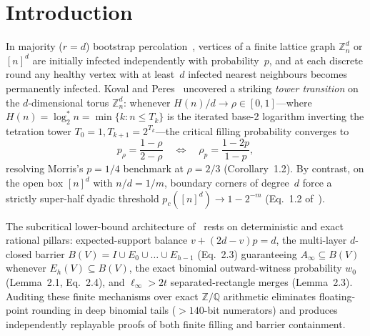 \documentclass[11pt,twocolumn]{article}
\newcommand{\ZZ}{\mathbb{Z}}
\newcommand{\QQ}{\mathbb{Q}}
\begin{document}
\section{Introduction}
In majority ($r=d$) bootstrap percolation~\cite{chalupa1979bootstrap,balogh2009majority,balogh2012sharp,morris2017bootstrap}, vertices of a finite lattice graph $\ZZ_n^d$ or $[n]^d$ are initially infected independently with probability~$p$, and at each discrete round any healthy vertex with at least~$d$ infected nearest neighbours becomes permanently infected. Koval and Peres~\cite{koval2026tower} uncovered a striking \emph{tower transition} on the $d$-dimensional torus $\ZZ_n^d$: whenever $H(n)/d \to \rho \in [0,1]$—where $H(n)=\log_2^\ast n = \min\{k : n \le T_k\}$ is the iterated base-2 logarithm inverting the tetration tower $T_0=1, T_{k+1}=2^{T_k}$—the critical filling probability converges to
\begin{equation}
  p_\rho = \frac{1-\rho}{2-\rho} \quad \Longleftrightarrow \quad \rho_p = \frac{1-2p}{1-p},
  \label{eq:tower}
\end{equation}
resolving Morris's $p=1/4$ benchmark at $\rho = 2/3$ (Corollary~1.2). By contrast, on the open box $[n]^d$ with $n/d = 1/m$, boundary corners of degree~$d$ force a strictly super-half dyadic threshold $p_c([n]^d) \to 1 - 2^{-m}$ (Eq.~1.2 of~\cite{koval2026tower}).

The subcritical lower-bound architecture of~\cite{koval2026tower} rests on deterministic and exact rational pillars: expected-support balance $v + (2d-v)p = d$, the multi-layer $d$-closed barrier $B(V) = I \cup E_0 \cup \dots \cup E_{h-1}$ (Eq.~2.3) guaranteeing $A_\infty \subseteq B(V)$ whenever $E_h(V) \subseteq B(V)$, the exact binomial outward-witness probability $w_0$ (Lemma~2.1, Eq.~2.4), and $\ell_\infty > 2t$ separated-rectangle merges (Lemma~2.3). Auditing these finite mechanisms over exact $\ZZ/\QQ$ arithmetic eliminates floating-point rounding in deep binomial tails ($>140$-bit numerators) and produces independently replayable proofs of both finite filling and barrier containment.
\end{document}
